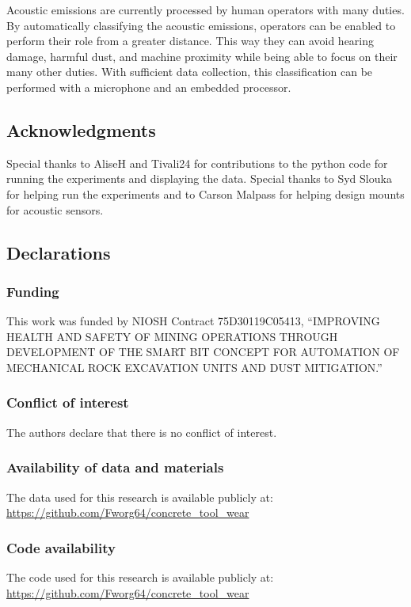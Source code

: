 Acoustic emissions are currently processed by human operators with many duties. 
By automatically classifying the acoustic emissions, operators
can be enabled to perform their role from a greater distance.
This way they can avoid hearing damage, harmful dust, and machine proximity
while being able to focus on their many other duties.
With sufficient data collection, 
this classification can be performed with a microphone and an embedded processor.



\subsection{Acknowledgments}

Special thanks to AliseH and Tivali24 for contributions to the python code for running the experiments
and displaying the data. Special thanks to Syd Slouka for helping run the experiments 
and to Carson Malpass for helping design mounts for acoustic sensors. 

\subsection*{Declarations}

\subsubsection*{Funding}
This work was funded by NIOSH Contract
75D30119C05413, “IMPROVING HEALTH AND SAFETY OF
MINING OPERATIONS THROUGH DEVELOPMENT OF THE
SMART BIT CONCEPT FOR AUTOMATION OF MECHANICAL
ROCK EXCAVATION UNITS AND DUST MITIGATION.”

\subsubsection*{Conflict of interest}
The authors declare that there is no conflict of interest.

\subsubsection*{Availability of data and materials}
The data used for this research is available publicly at: \\
\url{https://github.com/Fworg64/concrete_tool_wear}

\subsubsection*{Code availability }
The code used for this research is available publicly at: \\
\url{https://github.com/Fworg64/concrete_tool_wear}

